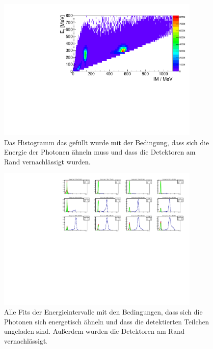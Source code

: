 \documentclass[a4paper,11pt,oneside,final,german,openbib,pdftex]{scrbook}
\begin{document}
{\begin{appendix}
\begin{figure}[h!]
	\begin{center}
		\includegraphics[width=100mm]{NewCalib/Strahlzeit2014/20171904Real30DegreeCutHist}
		\caption[Strahlzeit: 2D-Hist ohne Detektoren am Rand]{Das Histogramm das gef\"ullt wurde mit der Bedingung, dass sich die Energie der Photonen \"ahneln muss und dass die Detektoren am Rand vernachl\"assigt wurden.}
		\label{fig:30-Degree-Cut-Histogramm}
	\end{center}
\end{figure}


\begin{figure}[h!]
	\begin{center}
		\includegraphics[width=100mm]{NewCalib/Strahlzeit2014/20171904Real30DegreeCutAllFits}
		\caption[Strahlzeit: 2D-Hist ohne Detektoren am Rand; alle Fits]{Alle Fits der Energieintervalle mit den Bedingungen, dass sich die Photonen sich energetisch ähneln und dass die detektierten Teilchen ungeladen sind. Au{\ss}erdem wurden die Detektoren am Rand vernachl\"assigt.}
		\label{fig:30-Degree-Cut-RealData-All-Fits}
	\end{center}
\end{figure}







\end{appendix}}
\end{document}
